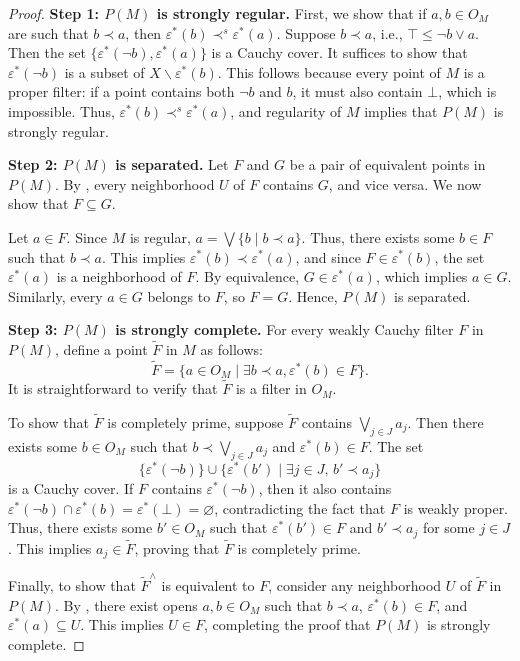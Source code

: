 \documentclass[reqno]{amsart}
\theoremstyle{definition}
\theoremstyle{remark}
\numberwithin{figure}{section}
\newcommand{\rb}{\prec}
\begin{document}
\begin{proof}
\textbf{Step 1: $P(M)$ is strongly regular.}
First, we show that if $a,b \in O_M$ are such that $b \rb a$, then $\varepsilon^*(b) \rb^s \varepsilon^*(a)$.
Suppose $b \rb a$, i.e., $\top \leq \neg b \vee a$.  
Then the set $\{ \varepsilon^*(\neg b), \varepsilon^*(a) \}$ is a Cauchy cover.
It suffices to show that $\varepsilon^*(\neg b)$ is a subset of $X \backslash \varepsilon^*(b)$.  
This follows because every point of $M$ is a proper filter: if a point contains both $\neg b$ and $b$, it must also contain $\bot$, which is impossible.
Thus, $\varepsilon^*(b) \rb^s \varepsilon^*(a)$, and regularity of $M$ implies that $P(M)$ is strongly regular.

\textbf{Step 2: $P(M)$ is separated.}
Let $F$ and $G$ be a pair of equivalent points in $P(M)$.
By , every neighborhood $U$ of $F$ contains $G$, and vice versa.
We now show that $F \subseteq G$.  

Let $a \in F$.
Since $M$ is regular, $a = \bigvee \{ b \mid b \rb a \}$.
Thus, there exists some $b \in F$ such that $b \rb a$.
This implies $\varepsilon^*(b) \rb \varepsilon^*(a)$, and since $F \in \varepsilon^*(b)$, the set $\varepsilon^*(a)$ is a neighborhood of $F$.  
By equivalence, $G \in \varepsilon^*(a)$, which implies $a \in G$.  
Similarly, every $a \in G$ belongs to $F$, so $F = G$.
Hence, $P(M)$ is separated.

\textbf{Step 3: $P(M)$ is strongly complete.}
For every weakly Cauchy filter $F$ in $P(M)$, define a point $\widetilde{F}$ in $M$ as follows:
\[
\widetilde{F} = \{ a \in O_M \mid \exists b \rb a, \varepsilon^*(b) \in F \}.
\]
It is straightforward to verify that $\widetilde{F}$ is a filter in $O_M$.

To show that $\widetilde{F}$ is completely prime, suppose $\widetilde{F}$ contains $\bigvee_{j \in J} a_j$.  
Then there exists some $b \in O_M$ such that $b \rb \bigvee_{j \in J} a_j$ and $\varepsilon^*(b) \in F$.  
The set 
\[
\{ \varepsilon^*(\neg b) \} \cup \{ \varepsilon^*(b') \mid \exists j \in J, \, b' \rb a_j \}
\]
is a Cauchy cover.  
If $F$ contains $\varepsilon^*(\neg b)$, then it also contains
$\varepsilon^*(\neg b) \cap \varepsilon^*(b) = \varepsilon^*(\bot) = \varnothing$,
contradicting the fact that $F$ is weakly proper.  
Thus, there exists some $b' \in O_M$ such that $\varepsilon^*(b') \in F$ and $b' \rb a_j$ for some $j \in J$.  
This implies $a_j \in \widetilde{F}$, proving that $\widetilde{F}$ is completely prime.  

Finally, to show that $\widetilde{F}^\wedge$ is equivalent to $F$, consider any neighborhood $U$ of $\widetilde{F}$ in $P(M)$.
By , there exist opens $a,b \in O_M$ such that $b \rb a$, $\varepsilon^*(b) \in F$, and $\varepsilon^*(a) \subseteq U$.
This implies $U \in F$, completing the proof that $P(M)$ is strongly complete.
\end{proof}
\end{document}
